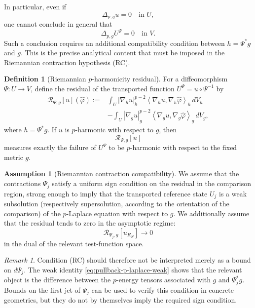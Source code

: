 \documentclass[11pt,a4paper]{article}
\theoremstyle{definition}
\newtheorem{definition}[theorem]{Definition}
\newtheorem{assumption}[theorem]{Assumption}
\theoremstyle{remark}
\newtheorem{remark}[theorem]{Remark}
\begin{document}
In particular, even if
\[
\Delta_{p,g}u=0
\quad\text{in }U,
\]
one cannot conclude in general that
\[
\Delta_{p,g}U^\Psi=0
\quad\text{in }V.
\]
Such a conclusion requires an additional compatibility condition between
$h=\Psi^\ast g$ and $g$. This is the precise analytical content that
must be imposed in the Riemannian contraction hypothesis (RC).

\begin{definition}[Riemannian $p$-harmonicity residual]
\label{def:riemannian-p-harmonic-residual}
For a diffeomorphism $\Psi:U\to V$, define the residual of the transported
function $U^\Psi=u\circ\Psi^{-1}$ by
\begin{align}
\mathcal R_{\Psi,g}[u](\widehat\varphi)
:={}&
\int_U
|\nabla_h u|_h^{p-2}
\left\langle
\nabla_hu,\nabla_h\widehat\varphi
\right\rangle_h\,dV_h
\nonumber\\
&-
\int_U
|\nabla_g u|_g^{p-2}
\left\langle
\nabla_gu,\nabla_g\widehat\varphi
\right\rangle_g\,dV_g,
\label{eq:riemannian-p-residual}
\end{align}
where $h=\Psi^\ast g$.
If $u$ is $p$-harmonic with respect to $g$, then
\[
\mathcal R_{\Psi,g}[u]
\]
measures exactly the failure of $U^\Psi$ to be $p$-harmonic with respect
to the fixed metric $g$.
\end{definition}

\begin{assumption}[Riemannian contraction compatibility]
\label{ass:RC-p-laplace}
We assume that the contractions $\Psi_j$ satisfy a uniform
sign condition on the residual in the comparison region, strong enough
to imply that the transported reference state $U_j$ is a weak
subsolution (respectively supersolution, according to the orientation
of the comparison) of the $p$-Laplace equation with respect to $g$.
We additionally assume that the residual tends to zero in the
asymptotic regime:
\[
\mathcal R_{\Psi_j,g}[u_{R_N}]
\longrightarrow0
\]
in the dual of the relevant test-function space.
\end{assumption}

\begin{remark}
Condition \textnormal{(RC)} should therefore not be interpreted merely
as a bound on $d\Psi_j$. The weak identity
\eqref{eq:pullback-p-laplace-weak} shows that the relevant object is the
difference between the $p$-energy tensors associated with $g$ and
$\Psi_j^\ast g$. Bounds on the first jet of $\Psi_j$ can be used to
verify this condition in concrete geometries, but they do not by
themselves imply the required sign condition.
\end{remark}
\end{document}
